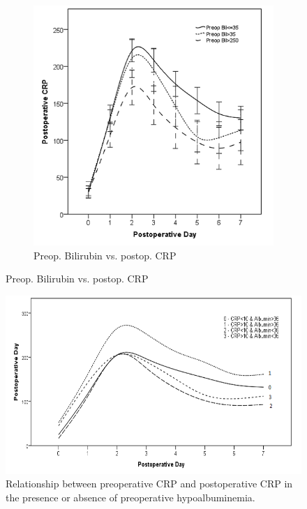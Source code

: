 \begin{figure}[p]
	\vspace{1cm}
	
	\begin{subfigure}{0.48\textwidth}
		\centering
		\includegraphics[width=\textwidth]{Figures/sirs_bil_crp}
		\caption{Preop. Bilirubin vs. postop. CRP}
		\label{fig:sirs_bil_crp}
	\end{subfigure}	
\end{figure}

\clearpage
\begin{figure}[t]
	\centering
	\includegraphics[width=\textwidth]{Figures/sirs_crp_crp_alb}
	\caption{Relationship between preoperative CRP and postoperative CRP in the presence or absence of preoperative hypoalbuminemia.}
	\label{fig:sirs_crp_crp_alb}
\end{figure}

\clearpage

